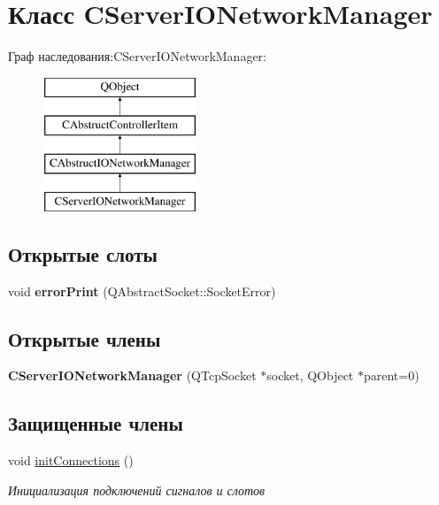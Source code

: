 \hypertarget{class_c_server_i_o_network_manager}{}\section{Класс C\+Server\+I\+O\+Network\+Manager}
\label{class_c_server_i_o_network_manager}
Граф наследования\+:C\+Server\+I\+O\+Network\+Manager\+:\begin{figure}[H]
\begin{center}
\leavevmode
\includegraphics[height=4.000000cm]{class_c_server_i_o_network_manager}
\end{center}
\end{figure}
\subsection*{Открытые слоты}
\begin{DoxyCompactItemize}
\item 
\hypertarget{class_c_server_i_o_network_manager_a27831f1d8f66c1e0d665c2ef52d262e4}{}\label{class_c_server_i_o_network_manager_a27831f1d8f66c1e0d665c2ef52d262e4} 
void {\bfseries error\+Print} (Q\+Abstract\+Socket\+::\+Socket\+Error)
\end{DoxyCompactItemize}
\subsection*{Открытые члены}
\begin{DoxyCompactItemize}
\item 
\hypertarget{class_c_server_i_o_network_manager_a89afb0912a02b5745aaad5ccea706304}{}\label{class_c_server_i_o_network_manager_a89afb0912a02b5745aaad5ccea706304} 
{\bfseries C\+Server\+I\+O\+Network\+Manager} (Q\+Tcp\+Socket $\ast$socket, Q\+Object $\ast$parent=0)
\end{DoxyCompactItemize}
\subsection*{Защищенные члены}
\begin{DoxyCompactItemize}
\item 
void \hyperlink{class_c_server_i_o_network_manager_a17155570c51dc951db52d827f120c689}{init\+Connections} ()
\begin{DoxyCompactList}\small\item\em Инициализация подключений сигналов и слотов \end{DoxyCompactList}\end{DoxyCompactItemize}
